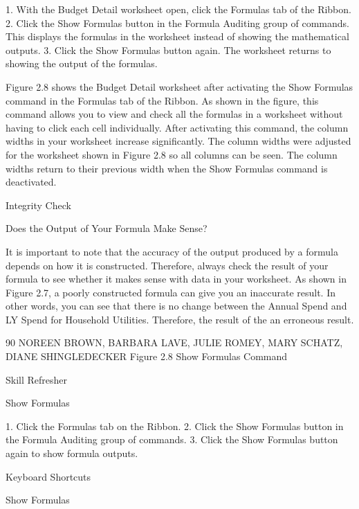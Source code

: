 1. With the Budget Detail worksheet open, click the Formulas tab of the Ribbon.
2. Click the Show Formulas button in the Formula Auditing group of commands. This displays the
formulas in the worksheet instead of showing the mathematical outputs.
3. Click the Show Formulas button again. The worksheet returns to showing the output of the
formulas.

Figure 2.8 shows the Budget Detail worksheet after activating the Show Formulas command in the
Formulas tab of the Ribbon. As shown in the figure, this command allows you to view and check
all the formulas in a worksheet without having to click each cell individually. After activating this
command, the column widths in your worksheet increase significantly. The column widths were
adjusted for the worksheet shown in Figure 2.8 so all columns can be seen. The column widths return
to their previous width when the Show Formulas command is deactivated.




Integrity Check

Does the Output of Your Formula Make Sense?

It is important to note that the accuracy of the output produced by a formula depends on how it is constructed.
Therefore, always check the result of your formula to see whether it makes sense with data in your worksheet. As
shown in Figure 2.7, a poorly constructed formula can give you an inaccurate result. In other words, you can see
that there is no change between the Annual Spend and LY Spend for Household Utilities. Therefore, the result of the
an erroneous result.




90 NOREEN BROWN, BARBARA LAVE, JULIE ROMEY, MARY SCHATZ, DIANE SHINGLEDECKER
Figure 2.8 Show Formulas Command




Skill Refresher


Show Formulas

1. Click the Formulas tab on the Ribbon.
2. Click the Show Formulas button in the Formula Auditing group of commands.
3. Click the Show Formulas button again to show formula outputs.




Keyboard Shortcuts


Show Formulas




